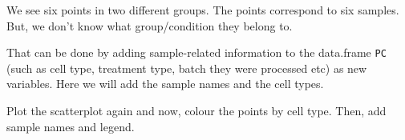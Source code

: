 \documentclass[
]{book}
\newenvironment{Shaded}{\begin{snugshade}}{\end{snugshade}}
\newcommand{\AttributeTok}[1]{\textcolor[rgb]{0.13,0.29,0.53}{#1}}
\newcommand{\DecValTok}[1]{\textcolor[rgb]{0.00,0.00,0.81}{#1}}
\newcommand{\FloatTok}[1]{\textcolor[rgb]{0.00,0.00,0.81}{#1}}
\newcommand{\FunctionTok}[1]{\textcolor[rgb]{0.13,0.29,0.53}{\textbf{#1}}}
\newcommand{\NormalTok}[1]{#1}
\newcommand{\OtherTok}[1]{\textcolor[rgb]{0.56,0.35,0.01}{#1}}
\newcommand{\SpecialCharTok}[1]{\textcolor[rgb]{0.81,0.36,0.00}{\textbf{#1}}}
\newcommand{\StringTok}[1]{\textcolor[rgb]{0.31,0.60,0.02}{#1}}
\begin{document}
We see six points in two different groups. The points correspond to six samples. But, we don't know what group/condition they belong to.

That can be done by adding sample-related information to the data.frame \texttt{PC} (such as cell type, treatment type, batch they were processed etc) as new variables. Here we will add the sample names and the cell types.

\begin{Shaded}
\end{Shaded}

Plot the scatterplot again and now, colour the points by cell type. Then, add sample names and legend.

\begin{Shaded}
\end{Shaded}
\end{document}
